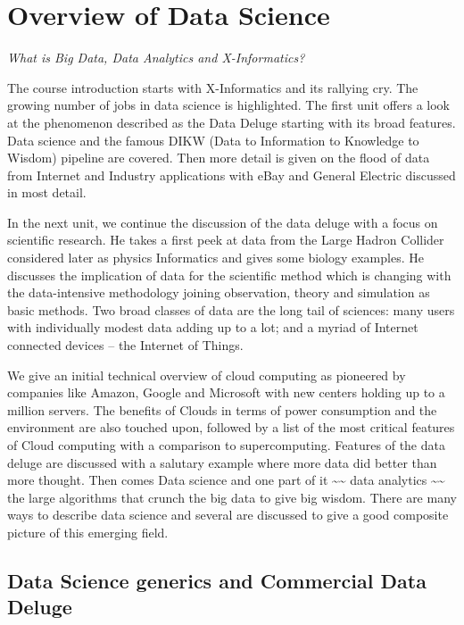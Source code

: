 \FILENAME

\section{Overview of Data Science}\label{overview-of-data-science}

\emph{What is Big Data, Data Analytics and X-Informatics?}

The course introduction starts with X-Informatics and its rallying cry.
The growing number of jobs in data science is highlighted. The first
unit offers a look at the phenomenon described as the Data Deluge
starting with its broad features. Data science and the famous DIKW (Data
to Information to Knowledge to Wisdom) pipeline are covered. Then more
detail is given on the flood of data from Internet and Industry
applications with eBay and General Electric discussed in most detail.

In the next unit, we continue the discussion of the data deluge with a
focus on scientific research. He takes a first peek at data from the
Large Hadron Collider considered later as physics Informatics and gives
some biology examples. He discusses the implication of data for the
scientific method which is changing with the data-intensive methodology
joining observation, theory and simulation as basic methods. Two broad
classes of data are the long tail of sciences: many users with
individually modest data adding up to a lot; and a myriad of Internet
connected devices -- the Internet of
Things.

We give an initial technical overview of cloud computing as pioneered by
companies like Amazon, Google and Microsoft with new centers holding up
to a million servers. The benefits of Clouds in terms of power
consumption and the environment are also touched upon, followed by a
list of the most critical features of Cloud computing with a comparison
to supercomputing. Features of the data deluge are discussed with a
salutary example where more data did better than more thought. Then
comes Data science and one part of it \textasciitilde{}\textasciitilde{}
data analytics \textasciitilde{}\textasciitilde{} the large algorithms
that crunch the big data to give big wisdom. There are many ways to
describe data science and several are discussed to give a good composite
picture of this emerging field.

\subsection{Data Science generics and Commercial Data
Deluge}\label{data-science-generics-and-commercial-data-deluge}

